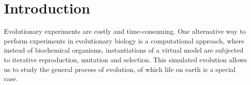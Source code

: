 \documentclass[10pt]{article}
\renewcommand{\paragraph}[1]{\textbf{#1}\hspace{2ex}}
\renewcommand{\paragraph}[1]{}
\begin{document}
\section{Introduction}


\paragraph{In silico evolution}
Evolutionary experiments are costly and
time-consuming. One alternative way to perform experiments in evolutionary
biology is a computational approach, where instead of biochemical organisms,
instantiations of a virtual model are subjected to iterative reproduction,
mutation and selection. This simulated evolution allows us to study the
general process of evolution, of which life on earth is a special
case.

\end{document}
